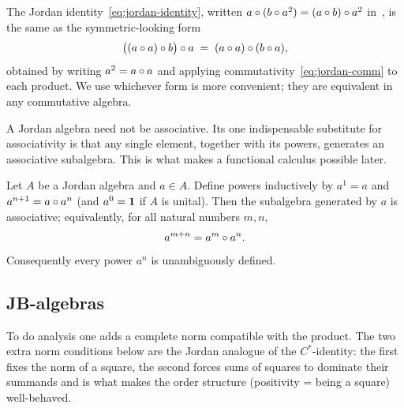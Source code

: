 \begin{remark}\label{rem:jordan-identity-form}
The Jordan identity~\eqref{eq:jordan-identity}, written
$a\circ(b\circ a^2)=(a\circ b)\circ a^2$ in~\cite{HancheOlsenStormer1984}, is the same as
the symmetric-looking form
\[
  \bigl((a\circ a)\circ b\bigr)\circ a \;=\; (a\circ a)\circ(b\circ a),
\]
obtained by writing $a^2=a\circ a$ and applying
commutativity~\eqref{eq:jordan-comm} to each product. We use whichever form is
more convenient; they are equivalent in any commutative algebra.
\end{remark}

A Jordan algebra need not be associative. Its one indispensable substitute for
associativity is that any single element, together with its powers, generates an
associative subalgebra. This is what makes a functional calculus possible later.

\begin{proposition}\label{prop:power-associative}
Let $A$ be a Jordan algebra and $a\in A$. Define powers inductively by $a^1=a$
and $a^{n+1}=a\circ a^n$ (and $a^0=\mathbf{1}$ if $A$ is unital). Then the subalgebra
generated by $a$ is associative; equivalently, for all natural numbers $m,n$,
\begin{equation}\label{eq:power-assoc}
  a^{m+n} = a^m \circ a^n .
\end{equation}
Consequently every power $a^n$ is unambiguously defined.
\end{proposition}


\subsection{JB-algebras}

To do analysis one adds a complete norm compatible with the product. The two
extra norm conditions below are the Jordan analogue of the $C^*$-identity: the
first fixes the norm of a square, the second forces sums of squares to dominate
their summands and is what makes the order structure (positivity = being a
square) well-behaved.

